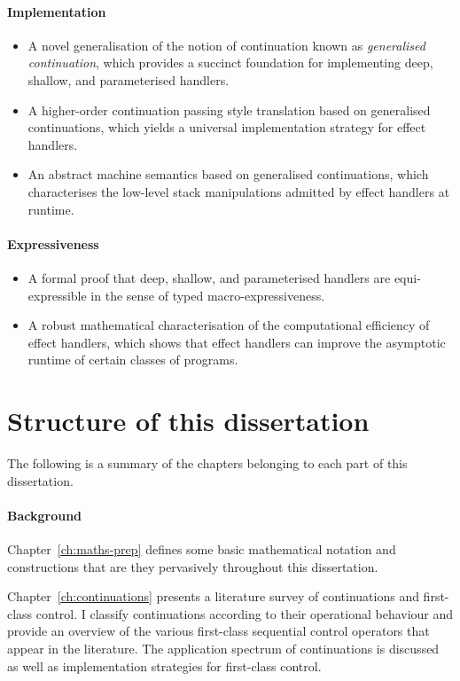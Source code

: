 \documentclass[12pt,phd,lfcs,twoside,openright,logo,leftchapter,normalheadings]{infthesis}
\theoremstyle{plain}
\theoremstyle{definition}
\begin{document}
\paragraph{Implementation}
\begin{itemize}
  \item A novel generalisation of the notion of continuation known as
    \emph{generalised continuation}, which provides a succinct
    foundation for implementing deep, shallow, and parameterised
    handlers.
  \item A higher-order continuation passing style translation based on
    generalised continuations, which yields a universal implementation
    strategy for effect handlers.
  \item An abstract machine semantics based on generalised
    continuations, which characterises the low-level stack
    manipulations admitted by effect handlers at runtime.
\end{itemize}
\paragraph{Expressiveness}
\begin{itemize}
  \item A formal proof that deep, shallow, and parameterised handlers
    are equi-expressible in the sense of typed macro-expressiveness.
  \item A robust mathematical characterisation of the computational
    efficiency of effect handlers, which shows that effect handlers
    can improve the asymptotic runtime of certain classes of programs.
\end{itemize}

\section{Structure of this dissertation}

The following is a summary of the chapters belonging to each part of
this dissertation.

\paragraph{Background}
Chapter~\ref{ch:maths-prep} defines some basic mathematical
notation and constructions that are they pervasively throughout this
dissertation.

Chapter~\ref{ch:continuations} presents a literature survey of
continuations and first-class control. I classify continuations
according to their operational behaviour and provide an overview of
the various first-class sequential control operators that appear in
the literature. The application spectrum of continuations is discussed
as well as implementation strategies for first-class control.
\end{document}
